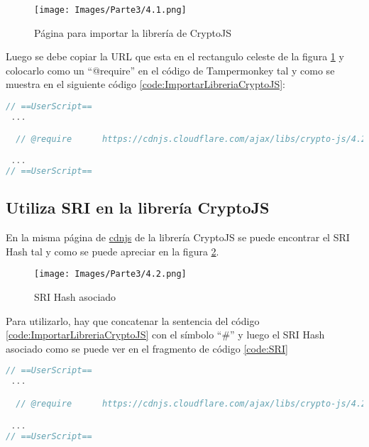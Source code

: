 \documentclass[letter,12pt]{article}
\newcounter{codecount}
\begin{document}
\begin{figure}[H]
    \centering
    \texttt{[image: Images/Parte3/4.1.png]}
    \caption{Página para importar la librería de CryptoJS}
    \label{fig:libreriadeCryptoJS}
\end{figure}

Luego se debe copiar la URL que esta en el rectangulo celeste de la figura \ref{fig:libreriadeCryptoJS} y colocarlo como un ``@require'' en el código de Tampermonkey tal y como se muestra en el siguiente código \ref{code:ImportarLibreriaCryptoJS}:

\label{code:ImportarLibreriaCryptoJS}
\begin{lstlisting}[language=JavaScript, caption={Importar librería cryptoJS}]
// ==UserScript==
 ...

  // @require      https://cdnjs.cloudflare.com/ajax/libs/crypto-js/4.2.0/crypto-js.min.js
        
 ...
// ==UserScript==

\end{lstlisting}

\clearpage

\subsection{Utiliza SRI en la librería CryptoJS}

En la misma página de \href{https://cdnjs.com/libraries/crypto-js}{cdnjs} de la librería CryptoJS se puede encontrar el SRI Hash tal y como se puede apreciar en la figura \ref{fig:SRIcopiar}.


\begin{figure}[H]
    \centering
    \texttt{[image: Images/Parte3/4.2.png]}
    \caption{SRI Hash asociado}
    \label{fig:SRIcopiar}
\end{figure}

Para utilizarlo, hay que concatenar la sentencia del código \ref{code:ImportarLibreriaCryptoJS} con el símbolo ``\#'' y luego el SRI Hash asociado como se puede ver en el fragmento de código \ref{code:SRI}

\label{code:SRI}
\begin{lstlisting}[language=JavaScript, caption={Uso de SRI en la librería CryptoJS}]
// ==UserScript==
 ...

  // @require      https://cdnjs.cloudflare.com/ajax/libs/crypto-js/4.2.0/crypto-js.min.js#sha512-a+SUDuwNzXDvz4XrIcXHuCf089/iJAoN4lmrXJg18XnduKK6YlDHNRalv4yd1N40OKI80tFidF+rqTFKGPoWFQ==

 ...
// ==UserScript==


\end{lstlisting}
\end{document}
